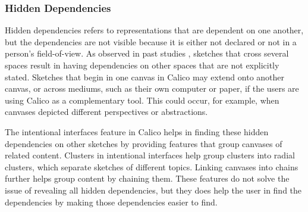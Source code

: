 
%

\subsubsection{Hidden Dependencies}
Hidden dependencies refers to representations that are dependent on one another, but the dependencies are not visible because it is either not declared or not in a person's field-of-view. As observed in past studies \cite{dekel2007notation}, sketches that cross several spaces result in having dependencies on other spaces that are not explicitly stated. Sketches that begin in one canvas in Calico may extend onto another canvas, or across mediums, such as their own computer or paper, if the users are using Calico as a complementary tool. This could occur, for example, when canvases depicted different perspectives or abstractions. 

The intentional interfaces feature in Calico helps in finding these hidden dependencies on other sketches by providing features that group canvases of related content. Clusters in intentional interfaces help group clusters into radial clusters, which separate sketches of different topics. Linking canvases into chains further helps group content by chaining them. These features do not solve the issue of revealing all hidden dependencies, but they does help the user in find the dependencies by making those dependencies easier to find.

